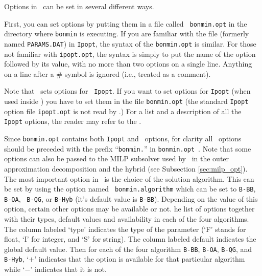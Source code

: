 
\begin{PageSummary}
\end{PageSummary}


Options in \Bonmin\ can be set in several different ways.

First, you can set options by putting them in a file called {\tt
bonmin.opt} in the directory where {\tt bonmin} is executing. If you
are familiar with the file
 (formerly named {\tt PARAMS.DAT}) in {\tt Ipopt}, the
syntax of the {\tt bonmin.opt} is similar. For those not familiar
with {\tt ipopt.opt}, the syntax is simply to put the name of the
option followed by its value, with no more than two options on a
single line. Anything on a line after a \# symbol is ignored (i.e.,
treated as a comment).

Note that \Bonmin\ sets options for {\tt
Ipopt}. If you want to set options for {\tt Ipopt} (when used inside \Bonmin) you have to set them
in the file {\tt bonmin.opt} (the standard {\tt Ipopt} option file {\tt ipopt.opt}
is not read by \Bonmin.)
For a list and a description of all the {\tt Ipopt} options, the
reader may refer to the
.

Since {\tt bonmin.opt} contains both {\tt Ipopt} and \Bonmin\ options, for clarity
all \Bonmin\ options should be preceded with the prefix ``{\tt bonmin.}'' in {\tt bonmin.opt}~.
Note that some options can also be passed to the MILP subsolver used by \Bonmin\
in the outer approximation decomposition
and the hybrid (see Subsection \ref{sec:milp_opt}).\\

The most important option in \Bonmin\ is the choice of the solution
algorithm. This can be set by using the option named {\tt
bonmin.algorithm} which can be set to {\tt B-BB}, {\tt B-OA}, {\tt
B-QG}, or {\tt B-Hyb} (it's default value is {\tt B-BB}). Depending
on the value of this option, certain other options may be available
or not. \latexhtml{Table \ref{tab:options} gives t}{T}he list of options together
with their types, default values and availability in each of the
four algorithms. The column labeled `type' indicates the type of the
parameter (`F' stands for float, `I' for integer, and `S' for
string). The column labeled default indicates the global default
value. Then for each of the four algorithm {\tt B-BB}, {\tt B-OA},
{\tt B-QG}, and {\tt B-Hyb}, `$+$' indicates that the option is
available for that particular algorithm
while `$-$' indicates that it is not.\\

